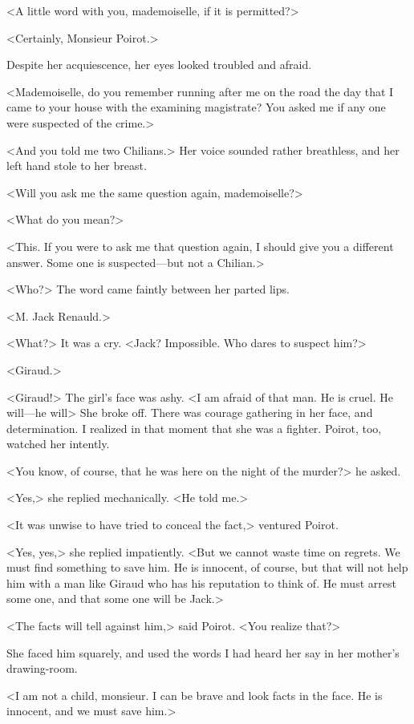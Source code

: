  <A little word with you, mademoiselle, if it is permitted?> 

 <Certainly, Monsieur Poirot.> 

 Despite her acquiescence, her eyes looked troubled and afraid. 

 <Mademoiselle, do you remember running after me on the road the day that I came to your house with the examining magistrate? You asked me if any one were suspected of the crime.> 

 <And you told me two Chilians.> Her voice sounded rather breathless, and her left hand stole to her breast. 

 <Will you ask me the same question again, mademoiselle?> 

 <What do you mean?> 

 <This. If you were to ask me that question again, I should give you a different answer. Some one is suspected—but not a Chilian.> 

 <Who?> The word came faintly between her parted lips. 

 <M. Jack Renauld.> 

 <What?> It was a cry. <Jack? Impossible. Who dares to suspect him?> 

 <Giraud.> 

 <Giraud!> The girl's face was ashy. <I am afraid of that man. He is cruel. He will—he will\longdash> She broke off. There was courage gathering in her face, and determination. I realized in that moment that she was a fighter. Poirot, too, watched her intently. 

 <You know, of course, that he was here on the night of the murder?> he asked. 

 <Yes,> she replied mechanically. <He told me.> 

 <It was unwise to have tried to conceal the fact,> ventured Poirot. 

 <Yes, yes,> she replied impatiently. <But we cannot waste time on regrets. We must find something to save him. He is innocent, of course, but that will not help him with a man like Giraud who has his reputation to think of. He must arrest some one, and that some one will be Jack.> 

 <The facts will tell against him,> said Poirot. <You realize that?> 

 She faced him squarely, and used the words I had heard her say in her mother's drawing-room. 

 <I am not a child, monsieur. I can be brave and look facts in the face. He is innocent, and we must save him.> 


